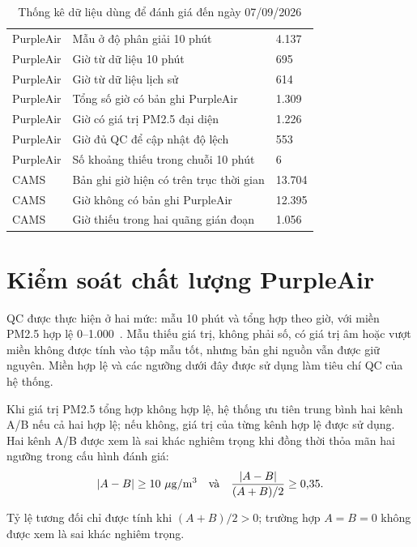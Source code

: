\documentclass[a4paper,oneside,openany]{extreport}
\begin{document}
\begin{table}[H]
\centering
\caption{Thống kê dữ liệu dùng để đánh giá đến ngày 07/09/2026}
\label{tab:data_stats}
\begin{tabularx}{0.94\textwidth}{|L{0.20\textwidth}|Y|C{0.16\textwidth}|}
\hline
{} &  &  \\
\hline
PurpleAir & Mẫu ở độ phân giải 10 phút & 4.137 \\
\hline
PurpleAir & Giờ từ dữ liệu 10 phút & 695 \\
\hline
PurpleAir & Giờ từ dữ liệu lịch sử & 614 \\
\hline
PurpleAir & Tổng số giờ có bản ghi PurpleAir & 1.309 \\
\hline
PurpleAir & Giờ có giá trị PM2.5 đại diện & 1.226 \\
\hline
PurpleAir & Giờ đủ QC để cập nhật độ lệch & 553 \\
\hline
PurpleAir & Số khoảng thiếu trong chuỗi 10 phút & 6 \\
\hline
CAMS & Bản ghi giờ hiện có trên trục thời gian & 13.704 \\
\hline
CAMS & Giờ không có bản ghi PurpleAir & 12.395 \\
\hline
CAMS & Giờ thiếu trong hai quãng gián đoạn & 1.056 \\
\hline
\end{tabularx}
\end{table}

\section{Kiểm soát chất lượng PurpleAir}
QC được thực hiện ở hai mức: mẫu 10 phút và tổng hợp theo giờ, với miền PM2.5 hợp lệ 0--1.000~\pmunit{}. Mẫu thiếu giá trị, không phải số, có giá trị âm hoặc vượt miền không được tính vào tập mẫu tốt, nhưng bản ghi nguồn vẫn được giữ nguyên. Miền hợp lệ và các ngưỡng dưới đây được sử dụng làm tiêu chí QC của hệ thống.

Khi giá trị PM2.5 tổng hợp không hợp lệ, hệ thống ưu tiên trung bình hai kênh A/B nếu cả hai hợp lệ; nếu không, giá trị của từng kênh hợp lệ được sử dụng. Hai kênh A/B được xem là sai khác nghiêm trọng khi đồng thời thỏa mãn hai ngưỡng trong cấu hình đánh giá:
\begin{equation}
|A-B|\geq 10~\mu\mathrm{g}/\mathrm{m}^{3}{} \quad \text{và} \quad
\frac{|A-B|}{(A+B)/2}\geq 0{,}35.
\end{equation}

Tỷ lệ tương đối chỉ được tính khi $(A+B)/2>0$; trường hợp $A=B=0$ không được xem là sai khác nghiêm trọng.
\end{document}
